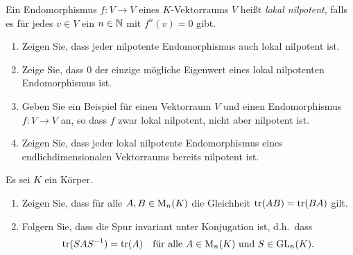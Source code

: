 \begin{question}
  Ein Endomorphismus $f \colon V \to V$ eines $K$-Vektorraums $V$ heißt \emph{lokal nilpotent}, falls es für jedes $v \in V$ ein $n \in \mathbb{N}$ mit $f^n(v) = 0$ gibt.
  \begin{enumerate}[leftmargin=*]
    \item
      Zeigen Sie, dass jeder nilpotente Endomorphismus auch lokal nilpotent ist.
    \item
      Zeige Sie, dass $0$ der einzige mögliche Eigenwert eines lokal nilpotenten Endomorphismus ist.
    \item
      Geben Sie ein Beispiel für einen Vektorraum $V$ und einen Endomorphismus $f \colon V \to V$ an, so dass $f$ zwar lokal nilpotent, nicht aber nilpotent ist.
    \item
      Zeigen Sie, dass jeder lokal nilpotente Endomorphismus eines endlichdimensionalen Vektorraums bereits nilpotent ist.
  \end{enumerate}
\end{question}


\begin{question}
  Es sei $K$ ein Körper.
  \begin{enumerate}[leftmargin=*]
    \item
      Zeigen Sie, dass für alle $A, B \in \operatorname{M}_n(K)$ die Gleichheit $\operatorname{tr}(AB) = \operatorname{tr}(BA)$ gilt.
    \item
      Folgern Sie, dass die Spur invariant unter Konjugation ist, d.h.\ dass
      \[
        \operatorname{tr}(S A S^{-1}) = \operatorname{tr}(A)
        \quad
        \text{für alle $A \in \operatorname{M}_n(K)$ und $S \in \operatorname{GL}_n(K)$}.
      \]
  \end{enumerate}
\end{question}


